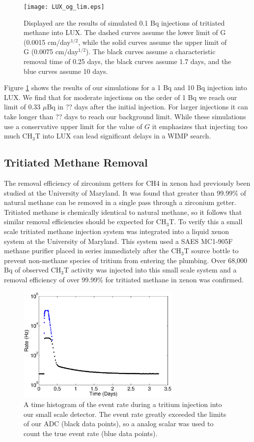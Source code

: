 \begin{figure}[h!]
\centering
\texttt{[image: LUX\_og\_lim.eps]}
\caption{Displayed are the results of simulated 0.1 Bq injections of tritiated methane into LUX. The dashed curves assume the lower limit of G (0.0015 cm/day$^{1/2}$, while the solid curves assume the upper limit of G (0.0075 cm/day$^{1/2}$). The black curves assume a  characteristic removal time of 0.25 days, the black curves assume 1.7 days, and the blue curves assume 10 days.}
\label{fig:tau_var}
\end{figure}

Figure \ref{fig:tau_var} shows the results of our simulations for a 1 Bq and 10 Bq injection into LUX.  We find that for moderate injections on the order of 1 Bq we reach our limit of 0.33 $\mu$Bq in ?? days after the initial injection.  For larger injections it can take longer than ?? days to reach our background limit.  While these simulations use a conservative upper limit for the value of $G$ it emphasizes that injecting too much CH$_3$T into LUX can lead significant delays in a WIMP search.  


\subsection{Tritiated Methane Removal}
\label{sec:RD}

The removal efficiency of zirconium getters for CH4 in xenon had previously been studied at the University of Maryland.  It was found that greater than 99.99\% of natural methane can be removed in a single pass through a zirconium getter. \cite{Dobi_CH4} Tritiated methane is chemically identical to natural methane, so it follows that similar removal efficiencies should be expected for CH$_3$T.  To verify this a small scale tritiated methane injection system was integrated into a liquid xenon system at the University of Maryland.  This system used a SAES MC1-905F methane purifier placed in series immediately after the CH$_3$T source bottle to prevent non-methane species of tritium from entering the plumbing. Over 68,000 Bq of observed CH$_3$T activity was injected into this small scale system and a removal efficiency of over 99.99\% for tritiated methane in xenon was confirmed.

\begin{figure}[h!]\centering
\includegraphics[width=80mm]{TimeHisto_Analog2.eps}
\caption{A time histogram of the event rate during a tritium injection into our small scale detector. The event rate greatly exceeded the limits of our ADC (black data points), so a analog scalar was used to count the true event rate (blue data points). }
\label{fig:Density}
\end{figure}


